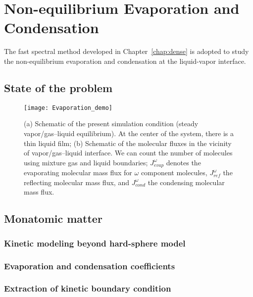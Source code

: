 

\chapter{Non-equilibrium Evaporation and Condensation}
\label{chap:Evap_Cond}


The fast spectral method developed in Chapter~\ref{chap:dense} is adopted to study the non-equilibrium evaporation and condensation at the liquid-vapor interface. 


\section{State of the problem}





\begin{figure}[h]
	\centering
	\texttt{[image: Evaporation\_demo]}
	\caption{ \cite{Kon2014,Ohashi2020ScientificRep} (a) Schematic of the present simulation condition (steady vapor/gas–liquid equilibrium). At the center of the system, there is a thin liquid film; (b) Schematic of the molecular fluxes in the vicinity of vapor/gas–liquid interface. We can count the number of molecules using mixture gas and liquid boundaries; $J^\omega_{evap}$	denotes the evaporating molecular mass flux for $\omega$ component molecules, $J^\omega_{ref}$ the reflecting molecular mass flux, and $J^\omega_{cond}$ the condensing molecular mass flux.
	}
	\label{Evap_demo}
\end{figure}
\newpage

\section{Monatomic matter}


\subsection{Kinetic modeling beyond hard-sphere model}

\subsection{Evaporation and condensation coefficients}

\subsection{Extraction of kinetic boundary condition}

